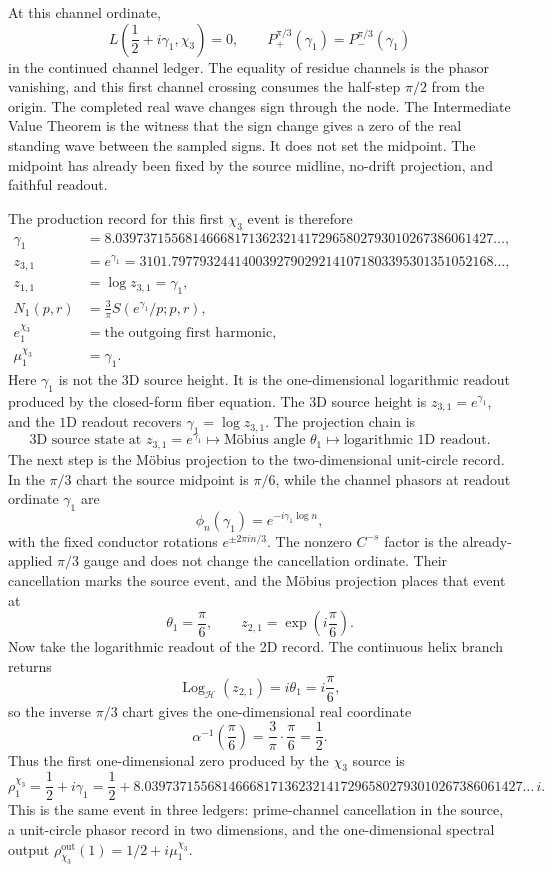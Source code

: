 \documentclass[11pt]{article}
\DeclareMathOperator{\Log}{Log}
\begin{document}
At this channel ordinate,
\[
  L\left(\frac12+i\gamma_1,\chi_3\right)=0,
  \qquad
  P_+^{\pi/3}(\gamma_1)=P_-^{\pi/3}(\gamma_1)
\]
in the continued channel ledger.  The equality of residue channels is the
phasor vanishing, and this first channel crossing consumes the half-step
$\pi/2$ from the origin.  The completed real wave changes sign through the
node.  The Intermediate Value Theorem is the witness that the sign change gives
a zero of the real standing wave between the sampled signs.  It does not set
the midpoint.  The midpoint has already been fixed by the source midline,
no-drift projection, and faithful readout.

The production record for this first $\chi_3$ event is therefore
\[
\begin{aligned}
  \gamma_1
    &=8.039737155681466681713623214172965802793010267386061427\ldots,\\
  z_{3,1}
    &=e^{\gamma_1}
      =3101.7977932441400392790292141071803395301351052168\ldots,\\
  z_{1,1}
    &=\log z_{3,1}=\gamma_1,\\
  N_1(p,r)
    &=\frac{3}{\pi}S(e^{\gamma_1}/p;p,r),\\
  e^{\chi_3}_1
    &=\text{the outgoing first harmonic},\\
  \mu^{\chi_3}_1
    &=\gamma_1 .
\end{aligned}
\]
Here $\gamma_1$ is not the 3D source height.  It is the one-dimensional
logarithmic readout produced by the closed-form fiber equation.  The 3D source
height is $z_{3,1}=e^{\gamma_1}$, and the $1$D readout recovers
$\gamma_1=\log z_{3,1}$.  The
projection chain is
\[
  \text{3D source state at }z_{3,1}=e^{\gamma_1}
  \longmapsto
  \text{Möbius angle }\theta_1
  \longmapsto
  \text{logarithmic 1D readout}.
\]
The next step is the Möbius projection to the two-dimensional unit-circle
record.  In the $\pi/3$ chart the source midpoint is $\pi/6$, while the
channel phasors at readout ordinate $\gamma_1$ are
\[
  \phi_n(\gamma_1)=e^{-i\gamma_1\log n},
\]
with the fixed conductor rotations $e^{\pm2\pi in/3}$.  The nonzero $C^{-s}$
factor is the already-applied $\pi/3$ gauge and does not change the cancellation
ordinate.
Their cancellation marks the source event, and the Möbius projection places
that event at
\[
  \theta_1=\frac{\pi}{6},
  \qquad
  z_{2,1}=\exp\left(i\frac{\pi}{6}\right).
\]
Now take the logarithmic readout of the 2D record.  The continuous helix branch
returns
\[
  \Log_{\mathcal H}(z_{2,1})=i\theta_1=i\frac{\pi}{6},
\]
so the inverse $\pi/3$ chart gives the one-dimensional real coordinate
\[
  \alpha^{-1}\!\left(\frac{\pi}{6}\right)
  =
  \frac3\pi\cdot\frac{\pi}{6}
  =
  \frac12 .
\]
Thus the first one-dimensional zero produced by the $\chi_3$ source is
\[
  \rho^{\chi_3}_1
  =\frac12+i\gamma_1
  =\frac12+
    8.039737155681466681713623214172965802793010267386061427\ldots\,i .
\]
This is the same event in three ledgers: prime-channel cancellation in the
source, a unit-circle phasor record in two dimensions, and the one-dimensional
spectral output $\rho^{\mathrm{out}}_{\chi_3}(1)=1/2+i\mu^{\chi_3}_1$.
\end{document}
